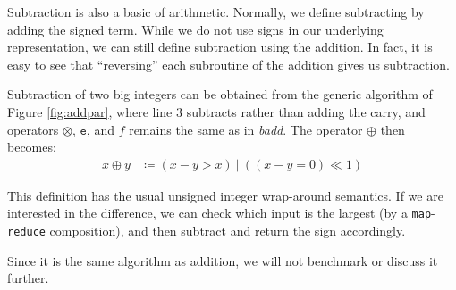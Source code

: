 Subtraction is also a basic of arithmetic. Normally, we define subtracting by
adding the signed term. While we do not use signs in our underlying
representation, we can still define subtraction using the addition. In fact, it
is easy to see that ``reversing'' each subroutine of the addition gives us
subtraction.

\begin{definition}
  Subtraction of two big integers can be obtained from the generic algorithm of
  Figure \ref{fig:addpar}, where line 3 subtracts rather than adding the carry,
  and operators $\otimes$, $\mathtt{e}$, and $f$ remains the same as in
  \textit{badd}. The operator $\oplus$ then becomes:
\begin{align}
  \label{eq:oplussub}
  x \oplus y &\coloneq (x - y > x)~|~((x - y = 0) \ll 1)
\end{align}
\end{definition}

This definition has the usual unsigned integer wrap-around semantics. If we are
interested in the difference, we can check which input is the largest (by a
\texttt{map}-\texttt{reduce} composition), and then subtract and return the sign
accordingly.

Since it is the same algorithm as addition, we will not benchmark or discuss it
further.

